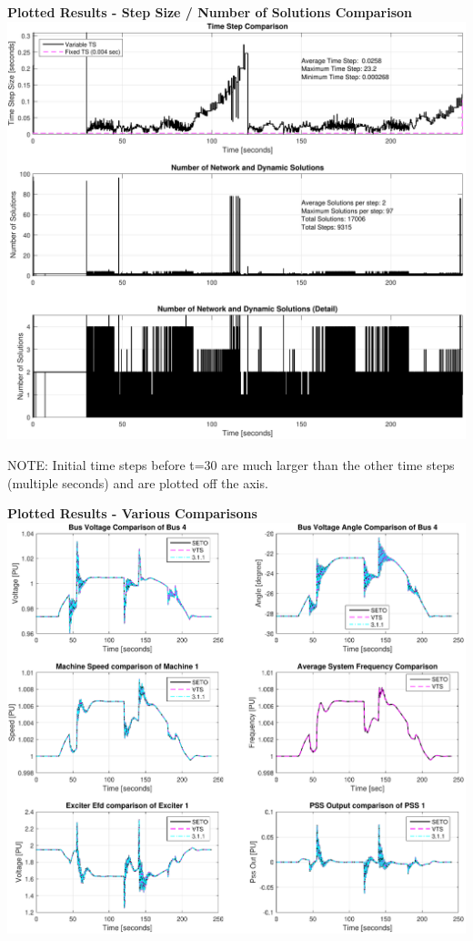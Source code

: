  

\textbf{Plotted Results - Step Size / Number of Solutions Comparison} \ \\
\includegraphics[width=\linewidth]{examples/extendedTerm/verSteps}

NOTE: Initial time steps before t=30 are much larger than the other time steps (multiple seconds) and are plotted off the axis.

\pagebreak
\textbf{Plotted Results - Various Comparisons} \ \\
\includegraphics[width=\linewidth]{examples/extendedTerm/verComp}

